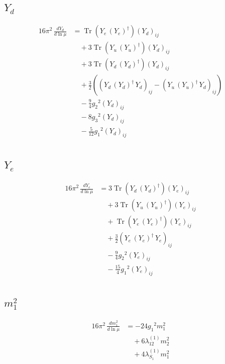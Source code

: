 \documentclass[10pt,a4paper]{article}
\begin{document}
\subsection*{$Y_d$}
\begin{align*}
16\pi^2\,\frac{d Y_d}{d\ln\mu} &=\operatorname{Tr}\!\left({Y_e}\,\left({Y_e}\right)^{\dagger}\right) \left({Y_d}\right)_{ij} \\
&\quad +3 \operatorname{Tr}\!\left({Y_u}\,\left({Y_u}\right)^{\dagger}\right) \left({Y_d}\right)_{ij} \\
&\quad +3 \operatorname{Tr}\!\left({Y_d}\,\left({Y_d}\right)^{\dagger}\right) \left({Y_d}\right)_{ij} \\
&\quad +\frac{3}{2} (\left({Y_d}\,\left({Y_d}\right)^{\dagger}\,{Y_d}\right)_{ij}-\left({Y_u}\,\left({Y_u}\right)^{\dagger}\,{Y_d}\right)_{ij}) \\
&\quad -\frac{9}{4} {g_2}^2 \left({Y_d}\right)_{ij} \\
&\quad -8 {g_3}^2 \left({Y_d}\right)_{ij} \\
&\quad -\frac{5}{12} {g_1}^2 \left({Y_d}\right)_{ij} \\
\end{align*}
\subsection*{$Y_e$}
\begin{align*}
16\pi^2\,\frac{d Y_e}{d\ln\mu} &=3 \operatorname{Tr}\!\left({Y_d}\,\left({Y_d}\right)^{\dagger}\right) \left({Y_e}\right)_{ij} \\
&\quad +3 \operatorname{Tr}\!\left({Y_u}\,\left({Y_u}\right)^{\dagger}\right) \left({Y_e}\right)_{ij} \\
&\quad +\operatorname{Tr}\!\left({Y_e}\,\left({Y_e}\right)^{\dagger}\right) \left({Y_e}\right)_{ij} \\
&\quad +\frac{3}{2} \left({Y_e}\,\left({Y_e}\right)^{\dagger}\,{Y_e}\right)_{ij} \\
&\quad -\frac{9}{4} {g_2}^2 \left({Y_e}\right)_{ij} \\
&\quad -\frac{15}{4} {g_1}^2 \left({Y_e}\right)_{ij} \\
\end{align*}
\subsection*{$m_1^2$}
\begin{align*}
16\pi^2\,\frac{d m_1^2}{d\ln\mu} &=-24 {g_1}^2 {m_1^2} \\
&\quad +6 {\lambda_{12}^{(1)}} {m_2^2} \\
&\quad +4 {\lambda_{S_1}^{(1)}} {m_1^2} \\
\end{align*}
\end{document}
